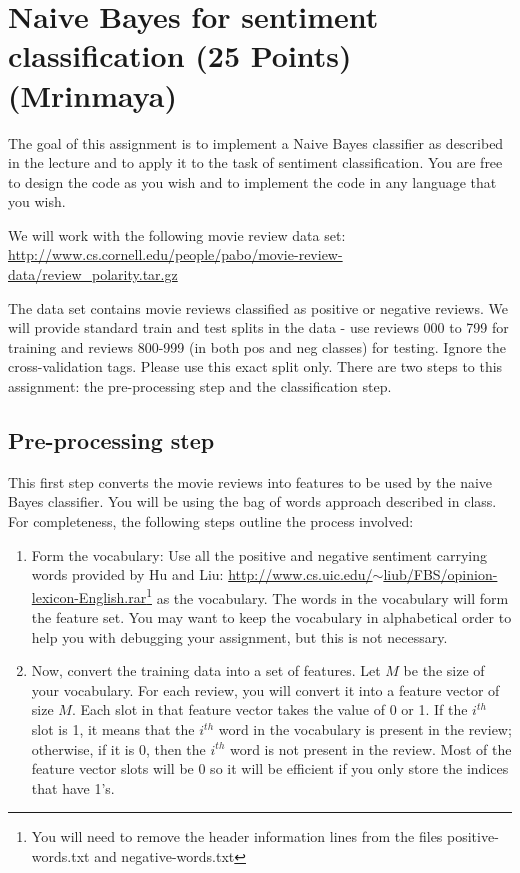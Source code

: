 
\section{Naive Bayes for sentiment classification (25 Points) (Mrinmaya)}
The goal of this assignment is to implement a Naive Bayes classifier as described in the lecture and to apply it to the task of sentiment classification. You are free to design the code as you wish and to implement the code in any language that you wish.

We will work with the following movie review data set:
\href{http://www.cs.cornell.edu/people/pabo/movie-review-data/review_polarity.tar.gz}{http://www.cs.cornell.edu/people/pabo/movie-review-data/review\_polarity.tar.gz}

The data set contains movie reviews classified as positive or negative reviews. {\color{red} We will provide standard train and test splits in the data - use reviews 000 to 799 for training and reviews 800-999 (in both pos and neg classes) for testing. Ignore the cross-validation tags. Please use this exact split only.} There are two steps to this assignment: the pre-processing step and the classification step.

\subsection{Pre-processing step}
This first step converts the movie reviews into features to be used by the naive Bayes classifier. You will be using the bag of words approach described in class. For completeness, the following steps outline the process involved:

\begin{enumerate}
\item 
Form the vocabulary: Use all the positive and negative sentiment carrying words provided by Hu and Liu: \href{http://www.cs.uic.edu/~liub/FBS/opinion-lexicon-English.rar}{http://www.cs.uic.edu/$\sim$liub/FBS/opinion-lexicon-English.rar}\footnote{You will need to remove the header information lines from the files positive-words.txt and negative-words.txt} as the vocabulary. The words in the vocabulary will form the feature set. You may want to keep the vocabulary in alphabetical order to help you with debugging your assignment, but this is not necessary.

\item Now, convert the training data into a set of features. Let $M$ be the size of your vocabulary. For each review, you will convert it into a feature vector of size $M$. Each slot in that feature vector takes the value of 0 or 1. If the $i^{th}$ slot is 1, it means that the $i^{th}$ word in the vocabulary is present in the review; otherwise, if it is 0, then the $i^{th}$ word is not present in the review. Most of the feature vector slots will be 0 so it will be efficient if you only store the indices that have 1's.
\end{enumerate}

